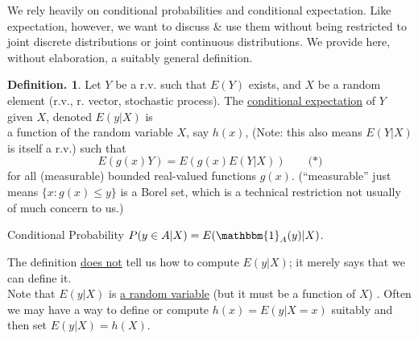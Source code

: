\documentclass[12pt]{article}
\theoremstyle{definition}
\newtheorem{mydef}{Definition.}[section]
\theoremstyle{plain}
\begin{document}
We rely heavily on conditional probabilities and conditional expectation. Like expectation, however, we want to discuss \& use them without being restricted to joint discrete distributions or joint continuous distributions. We provide here, without elaboration, a suitably general definition.

\begin{mydef}
Let $Y$ be a r.v. such that $E(Y)$ exists, and $X$ be a random element (r.v., r. vector, stochastic process). The \underline{conditional expectation} of $Y$ given $X$, denoted $E(y|X)$ is\\
a function of the random variable $X$, say $h(x)$, (Note: this also means $E(Y|X)$ is itself a r.v.) such that \[E(g(x)Y) = E(g(x)E(Y|X)) \qquad \text{(*)}\] for all (measurable) bounded real-valued functions $g(x)$. (``measurable'' just means $\{x:g(x) \leq y\}$ is a Borel set, which is a technical restriction not usually of much concern to us.)
\end{mydef}
Conditional Probability $P(y\in A | X) = E(\mathbbm{1}_A(y)|X)$. 

The definition \underline{does not} tell us how to compute $E(y|X)$; it merely says that we can define it.\\
Note that $E(y|X)$ is \underline{a random variable} (but it must be a function of $X$) . Often we may have a way to define or compute $h(x)=E(y|X=x)$ suitably and then set $E(y|X) = h(X)$.
\end{document}
